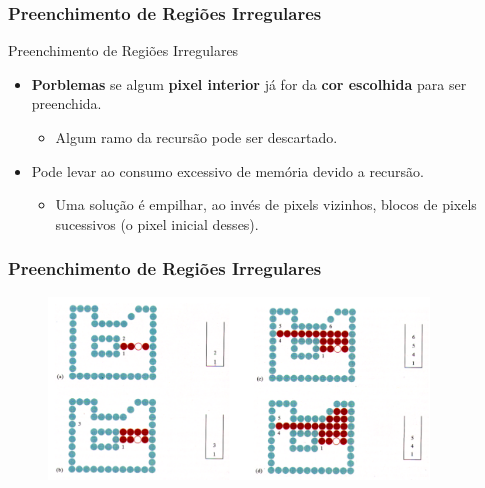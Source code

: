 \documentclass{beamer}
\begin{document}
\begin{frame}
\frametitle{Preenchimento de Regiões Irregulares}

	\begin{block}{Preenchimento de Regiões Irregulares}
		\begin{itemize}
			\item \textbf{Porblemas} se algum \textbf{pixel interior} já for da \textbf{cor escolhida} para ser preenchida.
			\begin{itemize}
				\item Algum ramo da recursão pode ser descartado.
			\end{itemize}
		\end{itemize}
	\end{block}

	\begin{block}{}
		\begin{itemize}
			\item Pode levar ao consumo excessivo de memória devido a recursão.
				\begin{itemize}
					\item Uma solução é empilhar, ao invés de pixels vizinhos, blocos de pixels sucessivos (o pixel inicial desses).
				\end{itemize}
		\end{itemize}
	\end{block}
\end{frame}

\begin{frame}
\frametitle{Preenchimento de Regiões Irregulares}

	\begin{figure}[!h]
			\begin{center}
				\includegraphics[width=0.9\textwidth]{Figures/BloFil}
			\end{center}
	\end{figure}
	
\end{frame}
\end{document}
